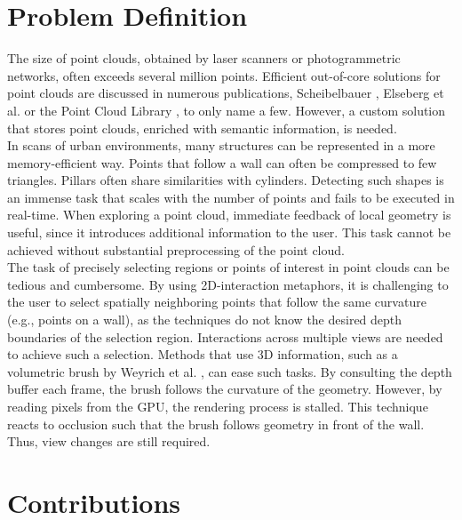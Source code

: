 \section{Problem Definition}

The size of point clouds, obtained by laser scanners or photogrammetric networks, often exceeds several million points. 
Efficient out-of-core solutions for point clouds are discussed in numerous publications, Scheibelbauer \cite{scheiblauer-thesis}, Elseberg et al. \cite{elseberg2013one} or the Point Cloud Library \cite{rusu20113d}, to only name a few. However, a custom solution that stores point clouds, enriched with semantic information, is needed.
\\
In scans of urban environments, many structures can be represented in a more memory-efficient way. Points that follow a wall can often be compressed to few triangles. Pillars often share similarities with cylinders. Detecting such shapes is an immense task that scales with the number of points and fails to be executed in real-time. When exploring a point cloud, immediate feedback of local geometry is useful, since it introduces additional information to the user. This task cannot be achieved without substantial preprocessing of the point cloud. 
\\
The task of precisely selecting regions or points of interest in point clouds can be tedious and cumbersome. By using 2D-interaction metaphors, it is challenging to the user to select spatially neighboring points that follow the same curvature (e.g., points on a wall), as the techniques do not know the desired depth boundaries of the selection region. Interactions across multiple views are needed to achieve such a selection.  Methods that use 3D information, such as a volumetric brush by Weyrich et al. \cite{weyrich2004post}, can ease such tasks. By consulting the depth buffer each frame, the brush follows the curvature of the geometry. However, by reading pixels from the GPU, the rendering process is stalled. This technique reacts to occlusion such that the brush follows geometry in front of the wall. Thus, view changes are still required.


\section{Contributions}

